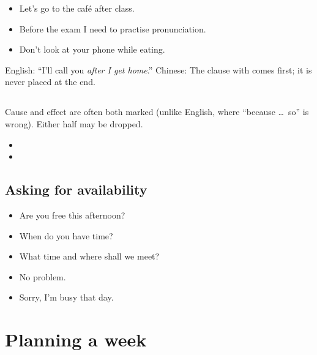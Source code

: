 \begin{itemize}
  \item {} Let's go to the café after class.
  \item {} Before the exam I need to practise pronunciation.
  \item {} Don't look at your phone while eating.
\end{itemize}

\begin{important}
English: ``I'll call you \emph{after I get home}.'' Chinese: 
The clause with  comes first; it is never placed at the end.
\end{important}

\subsection{}

Cause and effect are often both marked (unlike English, where ``because \ldots\ so''
is wrong). Either half may be dropped.
\begin{itemize}
  \item {}
  \item {}
\end{itemize}

\subsection{Asking for availability}

\begin{itemize}
  \item {} Are you free this afternoon?
  \item {} When do you have time?
  \item {} What time and where shall we meet?
  \item {} No problem.
  \item {} Sorry, I'm busy that day.
\end{itemize}

\section{Planning a week}

